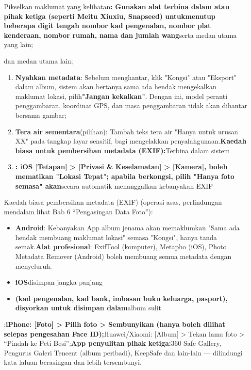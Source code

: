 
Pikselkan maklumat yang kelihatan\textbf{: Gunakan alat terbina dalam atau pihak ketiga (seperti Meitu Xiuxiu, Snapseed) untuk}\textbf{menutup beberapa digit tengah nombor kad pengenalan, nombor plat kenderaan, nombor rumah, nama dan jumlah wang}serta medan utama yang lain;

\begin{tcbwarn}{dan medan utama lain;}
\begin{enumerate}
  \item \textbf{Nyahkan metadata}: Sebelum menghantar, klik "Kongsi" atau "Eksport" dalam album, sistem akan bertanya sama ada hendak mengekalkan maklumat lokasi, pilih\textbf{"Jangan kekalkan"}. Dengan ini, model peranti penggambaran, koordinat GPS, dan masa penggambaran tidak akan dihantar bersama gambar;
  \item \textbf{Tera air sementara}(pilihan): Tambah teks tera air "Hanya untuk urusan XX" pada tangkap layar sensitif, bagi mengelakkan penyalahgunaan.\textbf{Kaedah biasa untuk pembersihan metadata (EXIF):}Terbina dalam sistem
  \item \textbf{: iOS [Tetapan] > [Privasi \& Keselamatan] > [Kamera], boleh mematikan "Lokasi Tepat"; apabila berkongsi, pilih "Hanya foto semasa" akan}secara automatik menanggalkan kebanyakan EXIF
\end{enumerate}

\end{tcbwarn}

Kaedah biasa pembersihan metadata (EXIF) (operasi asas, perlindungan mendalam lihat Bab 6 “Pengasingan Data Foto”):

\begin{itemize}
  \item \textbf{Android}: Kebanyakan App album jenama akan memaklumkan "Sama ada hendak membuang maklumat lokasi" semasa "Kongsi", hanya tanda semak.\textbf{Alat profesional}: ExifTool (komputer), Metapho (iOS), Photo Metadata Remover (Android) boleh membuang semua metadata dengan menyeluruh.
  \item \textbf{iOS}disimpan jangka panjang
  \item \textbf{(kad pengenalan, kad bank, imbasan buku keluarga, pasport), disyorkan untuk disimpan dalam}album sulit
\end{itemize}

:\textbf{iPhone: [Foto] > Pilih foto > Sembunyikan (hanya boleh dilihat selepas pengesahan Face ID);}Huawei/Xiaomi: [Album] > Tekan lama foto > “Pindah ke Peti Besi”;\textbf{App penyulitan pihak ketiga:}360 Safe Gallery, Pengurus Galeri Tencent (album peribadi), KeepSafe dan lain-lain — dilindungi kata laluan berasingan dan lebih tersembunyi.

